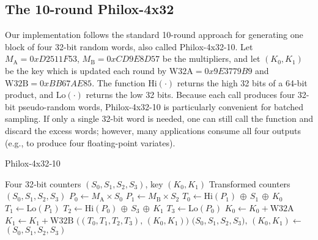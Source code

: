 \subsection{The 10-round Philox-4x32}
Our implementation follows the standard 10-round approach for generating one block of four 32-bit random words, also called Philox-4x32-10. Let \(M_{\mathrm{A}}=0xD2511F53\), \(M_{\mathrm{B}}=0xCD9E8D57\) be the multipliers, and let \((K_0, K_1)\) be the key which is updated each round by \(\mathrm{W32A}=0x9E3779B9\) and \(\mathrm{W32B}=0xBB67AE85\). The function \(\text{Hi}(\cdot)\) returns the high 32 bits of a 64-bit product, and \(\text{Lo}(\cdot)\) returns the low 32 bits. Because each call produces four 32-bit pseudo-random words, Philox-4x32-10 is particularly convenient for batched sampling. If only a single 32-bit word is needed, one can still call the function and discard the excess words; however, many applications consume all four outputs (e.g., to produce four floating-point variates).

\begin{algorithm}[ht]
  \caption{Philox‑4x32‑10}\label{alg:philox}
  \begin{algorithmic}[1]
    \Require Four 32‑bit counters $(S_0,S_1,S_2,S_3)$,
            key $(K_0,K_1)$
    \Ensure  Transformed counters $(S_0,S_1,S_2,S_3)$
    \Statex
      \State $P_0 \gets M_{\text{A}}\times S_0$ 
      \State $P_1 \gets M_{\text{B}}\times S_2$ 
      \State $T_0 \gets \mathrm{Hi}(P_1)\,\oplus\,S_1\,\oplus\,K_0$
      \State $T_1 \gets \mathrm{Lo}(P_1)$
      \State $T_2 \gets \mathrm{Hi}(P_0)\,\oplus\,S_3\,\oplus\,K_1$
      \State $T_3 \gets \mathrm{Lo}(P_0)$
      \State $K_0 \gets K_0 + \mathrm{W32A}$
      \State $K_1 \gets K_1 + \mathrm{W32B}$
      \State \Return $\bigl((T_0,T_1,T_2,T_3),\,(K_0,K_1)\bigr)$
    \EndProcedure
    \Statex
        \State $\bigl(S_0,S_1,S_2,S_3),\,(K_0,K_1) \gets$
      \EndFor
      \State \Return $(S_0,S_1,S_2,S_3)$
    \EndProcedure
  \end{algorithmic}
\end{algorithm}

